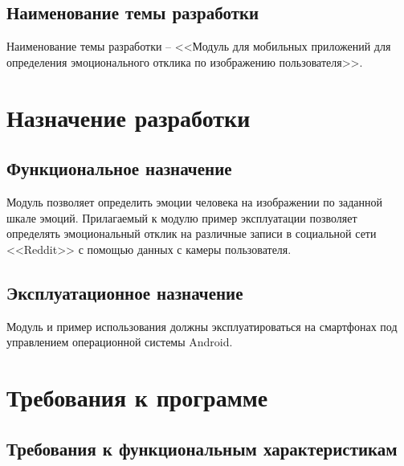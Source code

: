 \documentclass[a4paper,12pt,reqno]{article}
\begin{document}
    \subsection{Наименование темы разработки}
    Наименование темы разработки – <<Модуль для мобильных приложений для определения эмоционального отклика по изображению пользователя>>.

    \newpage
    \section{Назначение разработки}
    \subsection{Функциональное назначение}
    Модуль позволяет определить эмоции человека на изображении по заданной шкале эмоций. Прилагаемый к модулю пример эксплуатации позволяет определять эмоциональный отклик на различные записи в социальной сети <<Reddit>> с помощью данных с камеры пользователя.
    \subsection{Эксплуатационное назначение}
    Модуль и пример использования должны эксплуатироваться на смартфонах под управлением операционной системы Android.

    \newpage
    \section{Требования к программе}
    \subsection{Требования к функциональным характеристикам}
\end{document}
